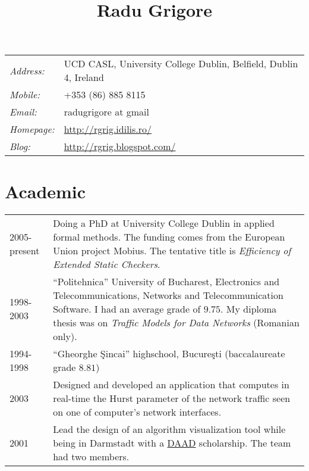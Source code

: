 \documentclass{article}
\title{Radu Grigore}
\author{}
\newcommand{\google}[1]
{\href{http://www.google.com/search?q=#1\&btnI=I'm+feeling+lucky}{#1}}
\begin{document}
\maketitle

\begin{supertabular}{lp{125mm}}
  \emph{Address:}& UCD CASL, University College Dublin,
  Belfield, Dublin 4, Ireland \\

  \emph{Mobile:}& +353 (86) 885 8115 \\

  \emph{Email:}& radugrigore at gmail \\

  \emph{Homepage:}& \url{http://rgrig.idilis.ro/} \\

  \emph{Blog:}& \url{http://rgrig.blogspot.com/} \\
\end{supertabular}


\section*{Academic}

\begin{supertabular}{lp{120mm}}
  2005-present& Doing a PhD at University College Dublin in applied
  formal methods. The funding comes from the European Union
  project Mobius. The tentative title is {\it Efficiency of
  Extended Static Checkers}. \\

  1998-2003& ``Politehnica'' University of Bucharest, Electronics and
  Telecommunications, Networks and Telecommunication Software. I had
  an average grade of $9.75$. My diploma thesis was on {\it Traffic 
  Models for Data Networks\/} (Romanian only). \\

  1994-1998& ``Gheorghe \c Sincai'' highschool, Bucure\c sti
  (baccalaureate grade $8.81$) \\

  2003& Designed and developed an application that computes in real-time
  the Hurst parameter of the network traffic seen on one of computer's
  network interfaces. \\

  2001& Lead the design of an algorithm visualization tool while
  being in Darmstadt with a \google{DAAD} scholarship. The team had
  two members.\\

\end{supertabular}
\end{document}
